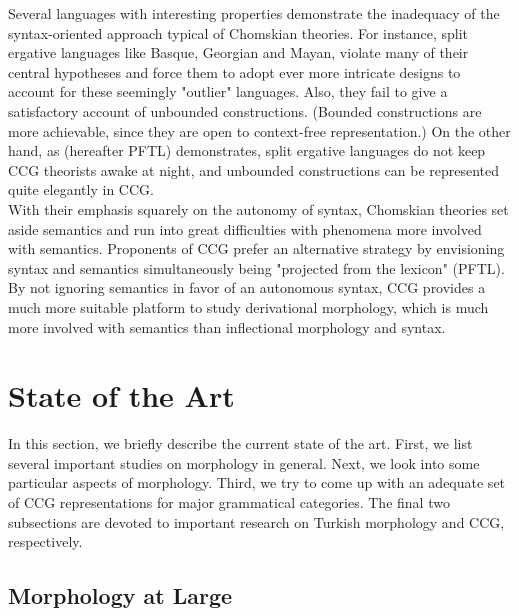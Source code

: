 \documentclass[11pt]{article} %
\begin{document}
Several languages with interesting properties demonstrate the inadequacy of the syntax-oriented approach typical of Chomskian theories. For instance, split ergative languages like Basque, Georgian and Mayan, violate many of their central hypotheses and force them to adopt ever more intricate designs to account for these seemingly "outlier" languages. Also, they fail to give a satisfactory account of unbounded constructions. (Bounded constructions are more achievable, since they are open to context-free representation.) On the other hand, as \citet{PFTL} (hereafter PFTL) demonstrates, split ergative languages do not keep CCG theorists awake at night, and unbounded constructions can be represented quite elegantly in CCG. \\

With their emphasis squarely on the autonomy of syntax, Chomskian theories set aside semantics and run into great difficulties with phenomena more involved with semantics. Proponents of CCG prefer an alternative strategy by envisioning syntax and semantics simultaneously being "projected from the lexicon" (PFTL). By not ignoring semantics in favor of an autonomous syntax, CCG provides a much more suitable platform to study derivational morphology, which is much more involved with semantics than inflectional morphology and syntax. \\

\newpage

\section{State of the Art}

\label{StArt}

In this section, we briefly describe the current state of the art. First, we list several important studies on morphology in general. Next, we look into some particular aspects of morphology. Third, we try to come up with an adequate set of CCG representations for major grammatical categories. The final two subsections are devoted to important research on Turkish morphology and CCG, respectively.

\subsection{Morphology at Large}

\label{MorphLarge}

\end{document}
